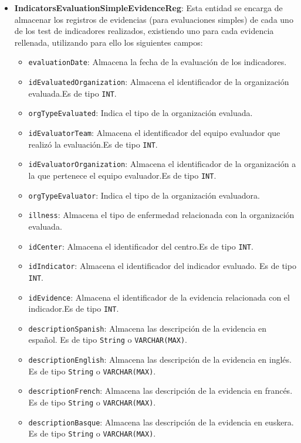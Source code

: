 \begin{itemize}
    
    \item \textbf{IndicatorsEvaluationSimpleEvidenceReg}: Esta entidad se encarga de almacenar los registros de evidencias (para evaluaciones simples) de cada uno de los test de indicadores realizados, existiendo uno para cada evidencia rellenada, utilizando para ello los siguientes campos:
    \begin{itemize}
      \item \texttt{evaluationDate}: Almacena la fecha de la evaluación de los indicadores.
      \item \texttt{idEvaluatedOrganization}: Almacena el identificador de la organización evaluada.Es de tipo \texttt{INT}.
      \item \texttt{orgTypeEvaluated}: Indica el tipo de la organización evaluada.
      \item \texttt{idEvaluatorTeam}: Almacena el identificador del equipo evaluador que realizó la evaluación.Es de tipo \texttt{INT}.
      \item \texttt{idEvaluatorOrganization}: Almacena el identificador de la organización a la que pertenece el equipo evaluador.Es de tipo \texttt{INT}.
      \item \texttt{orgTypeEvaluator}: Indica el tipo de la organización evaluadora.
      \item \texttt{illness}: Almacena el tipo de enfermedad relacionada con la organización evaluada.
      \item \texttt{idCenter}: Almacena el identificador del centro.Es de tipo \texttt{INT}.
      \item \texttt{idIndicator}: Almacena el identificador del indicador evaluado. Es de tipo \texttt{INT}.
      \item \texttt{idEvidence}: Almacena el identificador de la evidencia relacionada con el indicador.Es de tipo \texttt{INT}.
      \item \texttt{descriptionSpanish}: Almacena las descripción de la evidencia en español. Es de tipo \texttt{String} o \texttt{VARCHAR(MAX)}.
        \item \texttt{descriptionEnglish}: Almacena las descripción de la evidencia en inglés. Es de tipo \texttt{String} o \texttt{VARCHAR(MAX)}.
        \item \texttt{descriptionFrench}: Almacena las descripción de la evidencia en francés. Es de tipo \texttt{String} o \texttt{VARCHAR(MAX)}.
        \item \texttt{descriptionBasque}: Almacena las descripción de la evidencia en euskera. Es de tipo \texttt{String} o \texttt{VARCHAR(MAX)}.

\end{itemize}
\end{itemize}
